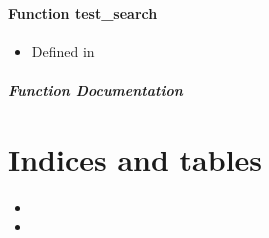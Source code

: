 \documentclass[letterpaper,10pt,english]{sphinxmanual}
\begin{document}
\sphinxstepscope


\subsubsection{Function test\_search}
\label{\detokenize{api/function_test_8h_1a0ba3050d5f0942ec012559ed47aeae80:function-test-search}}\label{\detokenize{api/function_test_8h_1a0ba3050d5f0942ec012559ed47aeae80:exhale-function-test-8h-1a0ba3050d5f0942ec012559ed47aeae80}}\label{\detokenize{api/function_test_8h_1a0ba3050d5f0942ec012559ed47aeae80::doc}}\begin{itemize}
\item {} 
\sphinxAtStartPar
Defined in 

\end{itemize}


\paragraph{Function Documentation}
\label{\detokenize{api/function_test_8h_1a0ba3050d5f0942ec012559ed47aeae80:function-documentation}}

\begin{fulllineitems}
\label{\detokenize{api/function_test_8h_1a0ba3050d5f0942ec012559ed47aeae80:_CPPv411test_searchv}}
\pysigstartsignatures
\pysigstartmultiline
{}
\pysigstopmultiline
\pysigstopsignatures
\end{fulllineitems}



\chapter{Indices and tables}
\label{\detokenize{index:indices-and-tables}}\begin{itemize}
\item {} 
\sphinxAtStartPar
{}

\item {} 
\sphinxAtStartPar
{}

\end{itemize}



\renewcommand{\indexname}{Index}
\printindex
\end{document}
